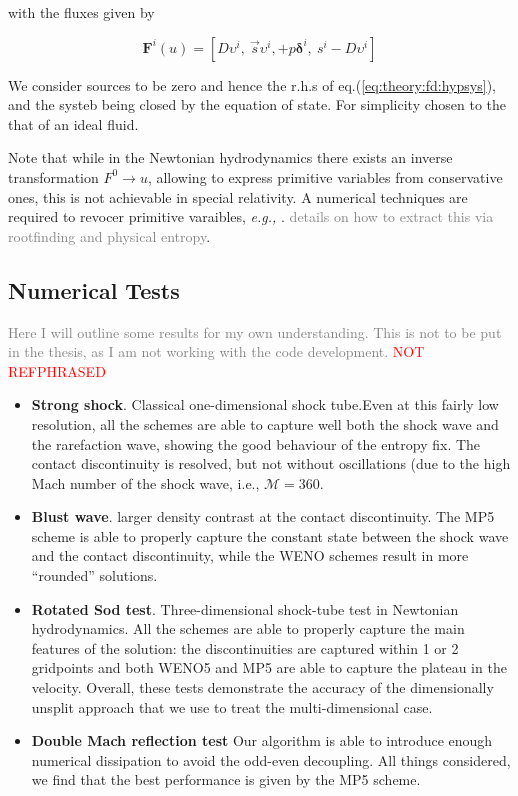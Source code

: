 \documentclass[11pt,a4paper,headinclude=true,DIV=14,BCOR=8mm,chapterprefix,listof=totoc,twoside,openright,abstracton]{scrbook}
\begin{document}
with the fluxes given by 

\begin{equation}
    \boldsymbol{F}^i(u) = [D\upsilon^i, \: \vec{s}\upsilon^i, + p\boldsymbol{\delta}^i, \: s^i-D\upsilon^i]
\end{equation}

We consider sources to be zero and hence the r.h.s of eq.(\ref{eq:theory:fd:hypsys}), and the systeb being closed by the equation of state. For simplicity chosen to the that of an ideal fluid.

Note that while in the Newtonian hydrodynamics there exists an inverse transformation $F^0\rightarrow u$, allowing to express primitive variables from conservative ones, this is not achievable in special relativity. A numerical techniques are required to revocer primitive varaibles, \textit{e.g.,} \cite{Kastaun:2006}. \textcolor{gray}{details on how to extract this via rootfinding and physical entropy}. 

\subsection{Numerical Tests}

\textcolor{gray}{Here I will outline some results for my own understanding. This is not to be put in the thesis, as I am not working with the code development.}
\textcolor{red}{NOT REFPHRASED}

\begin{itemize}
    \item \textbf{Strong shock}. Classical one-dimensional shock tube.Even at this fairly low resolution, all the schemes are able to capture well both the shock wave and the rarefaction wave, showing the good behaviour of the entropy fix. The contact discontinuity is resolved, but not without oscillations (due to the high Mach number of the shock wave, i.e., $\mathcal{M}=360$.
    \item \textbf{Blust wave}. larger density contrast at the contact discontinuity. The MP5 scheme is able to properly capture the constant state between the shock wave and the contact discontinuity, while the WENO schemes result in more “rounded” solutions.
    \item \textbf{Rotated Sod test}. Three-dimensional shock-tube test in Newtonian hydrodynamics. All the schemes are able to properly capture the main features of the solution: the discontinuities are captured within 1 or 2 gridpoints and both WENO5 and MP5 are able to capture the plateau in the velocity. Overall, these tests demonstrate the accuracy of the dimensionally unsplit approach that we use to treat the multi-dimensional case.
    \item \textbf{Double Mach reflection test} Our algorithm is able to introduce enough numerical dissipation to avoid the odd-even decoupling. All things considered, we find that the best performance is given by the MP5 scheme.
\end{itemize}
\end{document}
